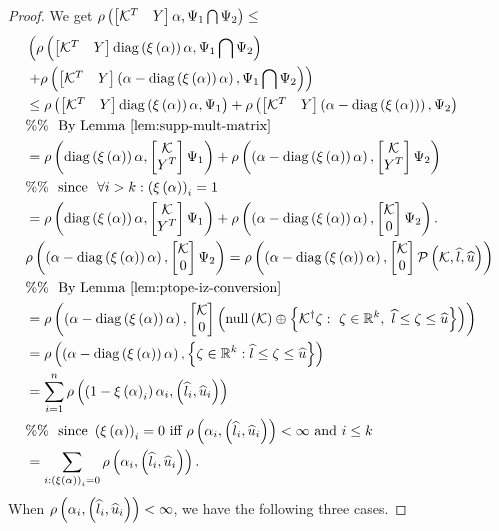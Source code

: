 \begin{proof}
We get $\supp{\mymatrix{\qtemp^T & Y}\alpha}{\Psi_1\bigcap\Psi_2}\leq$
%
\begin{align}
& \lt(\supp{\mymatrix{\qtemp^T &
Y}\diagonal{\ind{\alpha}}\alpha}{\Psi_1\bigcap\Psi_2}\right.\nonumber\\
& \left.+\supp{\mymatrix{\qtemp^T
& Y}\lt(\alpha-\diagonal{\ind{\alpha}}\alpha\rt)}{\Psi_1\bigcap\Psi_2}\right)\nonumber\\
& \leq \supp{\mymatrix{\qtemp^T &
Y}\diagonal{\ind{\alpha}}\alpha}{\Psi_1}
+\supp{\mymatrix{\qtemp^T &
Y}\lt(\alpha-\diagonal{\ind{\alpha}}\rt)}{\Psi_2}\nonumber\\
& \%\%~~\text{By Lemma~\ref{lem:supp-mult-matrix}}\nonumber\\
& = \supp{\diagonal{\ind{\alpha}}\alpha}{\mymatrix{\qtemp \\
Y^T}\Psi_1}
+\supp{\lt(\alpha-\diagonal{\ind{\alpha}}\alpha\rt)}{\mymatrix{\qtemp \\
Y^T}\Psi_2}\nonumber\\
& \%\%~~\text{since}~~\forall i>k:\lt(\ind{\alpha}\rt)_i=1\nonumber\\
& = \supp{\diagonal{\ind{\alpha}}\alpha}{\mymatrix{\qtemp \\
Y^T}\Psi_1}
+\supp{\lt(\alpha-\diagonal{\ind{\alpha}}\alpha\rt)}{\mymatrix{\qtemp \\
0}\Psi_2}.~\label{proof-supp1}\\
& \supp{\lt(\alpha-\diagonal{\ind{\alpha}}\alpha\rt)}{\mymatrix{\qtemp \\
0}\Psi_2}=\supp{\lt(\alpha-\diagonal{\ind{\alpha}}\alpha\rt)}{\mymatrix{\qtemp \\
0}\ptope{\qtemp}{\plb}{\pub}}\nonumber\\
& \%\%~~\text{By Lemma~\ref{lem:ptope-iz-conversion}}\nonumber\\
& = \supp{\lt(\alpha-\diagonal{\ind{\alpha}}\alpha\rt)}{\mymatrix{\qtemp \\
0}\lt(\nullspace{\qtemp}\oplus \set{\pinv{\qtemp}\zeta:~\zeta\in\reals^k,~\plb\leq\zeta\leq\pub}\rt)}\nonumber\\
& = \supp{\lt(\alpha-\diagonal{\ind{\alpha}}\alpha\rt)}{\set{\zeta\in\reals^k:\plb\leq\zeta\leq\pub}}\nonumber\\
& = \sum_{i=1}^n\supp{\lt(1-\ind{\alpha}_i\rt)\alpha_i}{\lt(\plb_i,\pub_i\rt)}\nonumber\\
& \%\%~~\text{since}~\lt(\ind{\alpha}\rt)_i=0~\text{iff}~\supp{\alpha_i}{\lt(\plb_i,\pub_i\rt)}<\infty
~\text{and}~i\leq k\nonumber\\
& = \sum_{i:\lt(\ind{\alpha}\rt)_i=0}\supp{\alpha_i}{\lt(\plb_i,\pub_i\rt)}.
\end{align}
%
When $\supp{\alpha_i}{\lt(\plb_i,\pub_i\rt)}<\infty$, we have the
following three cases.


\end{proof}
